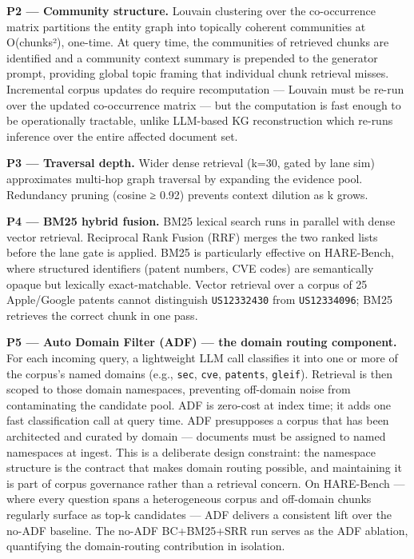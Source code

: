 \textbf{P2 --- Community structure.} Louvain clustering over the co-occurrence matrix partitions the entity graph into topically coherent communities at O(chunks²), one-time. At query time, the communities of retrieved chunks are identified and a community context summary is prepended to the generator prompt, providing global topic framing that individual chunk retrieval misses. Incremental corpus updates do require recomputation --- Louvain must be re-run over the updated co-occurrence matrix --- but the computation is fast enough to be operationally tractable, unlike LLM-based KG reconstruction which re-runs inference over the entire affected document set.

\textbf{P3 --- Traversal depth.} Wider dense retrieval (k=30, gated by lane sim) approximates multi-hop graph traversal by expanding the evidence pool. Redundancy pruning (cosine ≥ 0.92) prevents context dilution as k grows.

\textbf{P4 --- BM25 hybrid fusion.} BM25 lexical search runs in parallel with dense vector retrieval. Reciprocal Rank Fusion (RRF) merges the two ranked lists before the lane gate is applied. BM25 is particularly effective on HARE-Bench, where structured identifiers (patent numbers, CVE codes) are semantically opaque but lexically exact-matchable. Vector retrieval over a corpus of 25 Apple/Google patents cannot distinguish \texttt{US12332430} from \texttt{US12334096}; BM25 retrieves the correct chunk in one pass.

\textbf{P5 --- Auto Domain Filter (ADF) --- the domain routing component.} For each incoming query, a lightweight LLM call classifies it into one or more of the corpus's named domains (e.g., \texttt{sec}, \texttt{cve}, \texttt{patents}, \texttt{gleif}). Retrieval is then scoped to those domain namespaces, preventing off-domain noise from contaminating the candidate pool. ADF is zero-cost at index time; it adds one fast classification call at query time. ADF presupposes a corpus that has been architected and curated by domain --- documents must be assigned to named namespaces at ingest. This is a deliberate design constraint: the namespace structure is the contract that makes domain routing possible, and maintaining it is part of corpus governance rather than a retrieval concern. On HARE-Bench --- where every question spans a heterogeneous corpus and off-domain chunks regularly surface as top-k candidates --- ADF delivers a consistent lift over the no-ADF baseline. The no-ADF BC+BM25+SRR run serves as the ADF ablation, quantifying the domain-routing contribution in isolation.

